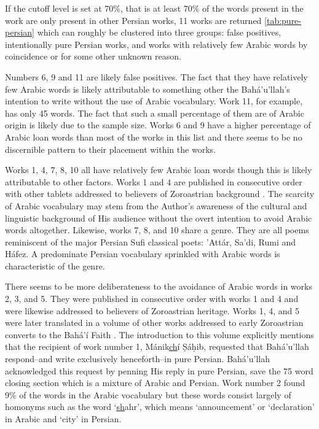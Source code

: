 \documentclass[12pt, oneside]{report}
\begin{document}
If the cutoff level is set at 70\%, that is at least 70\% of the words present in the work are only present in other Persian works, 11 works are returned \ref{tab:pure-persian} which can roughly be clustered into three groups: false positives, intentionally pure Persian works, and works with relatively few Arabic words by coincidence or for some other unknown reason.
\par
Numbers 6, 9 and 11 are likely false positives.
The fact that they have relatively few Arabic words is likely attributable to something other the Bah\'{a}'u'llah's intention to write without the use of Arabic vocabulary.
Work 11, for example, has only 45 words.
The fact that such a small percentage of them are of Arabic origin is likely due to the sample size.
Works 6 and 9 have a higher percentage of Arabic loan words than most of the works in this list and there seems to be no discernible pattern to their placement within the works.
\par
Works 1, 4, 7, 8, 10 all have relatively few Arabic loan words though this is likely attributable to other factors.
Works 1 and 4 are published in consecutive order with other tablets addressed to believers of Zoroastrian background \cite{bahaullah_majmu`ih-i_1920}.
The scarcity of Arabic vocabulary may stem from the Author's awareness of the cultural and linguistic background of His audience without the overt intention to avoid Arabic words altogether.
Likewise, works 7, 8, and 10 share a genre.
They are all poems reminiscent of the major Persian Sufi classical poets: 'Att\'{a}r, Sa'di, Rumi and H\'{a}fez.
A predominate Persian vocabulary sprinkled with Arabic words is characteristic of the genre.
\par
There seems to be more deliberateness to the avoidance of Arabic words in works 2, 3, and 5.
They were published in consecutive order with works 1 and 4 and were likewise addressed to believers of Zoroastrian heritage.
Works 1, 4, and 5 were later translated in a volume of other works addressed to early Zoroastrian converts to the Bah\'{a}'\'{i} Faith \cite{bahaullah_tabernacle_2006}.
The introduction to this volume explicitly mentions that the recipient of work number 1, M\'{a}nik\underline{ch}\'{i} Ṣ\'{a}ḥib, requested that Bah\'{a}'u'llah respond–and write exclusively henceforth–in pure Persian.
Bah\'{a}'u'llah acknowledged this request by penning His reply in pure Persian, save the 75 word closing section which is a mixture of Arabic and Persian.
Work number 2 found 9\% of the words in the Arabic vocabulary but these words consist largely of homonyms such as the word `\underline{sh}ahr', which means `announcement' or `declaration' in Arabic and `city' in Persian.
\end{document}
